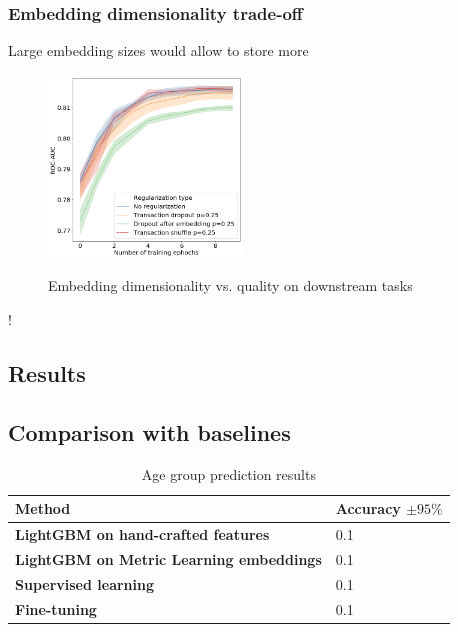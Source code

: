 \documentclass[sigconf]{acmart}
\begin{document}
\subsubsection{Embedding dimensionality trade-off}

Large embedding sizes would allow to store more

\begin{figure}[ht]
  \caption{Embedding dimensionality vs. quality on downstream tasks}
  \includegraphics[width=0.46\textwidth]{figures/tmp-pic.png}
  \label{fig-emb-dim}
\end{figure}


!

\subsection{Results} \label{sec-res}

\subsection{Comparison with baselines} \label{sec-res-baselines}


\begin{table}[ht]
\caption{Age group prediction results}
\begin{tabular}{ | m{18em} |  m{6em} | }
\hline
\textbf{Method} & \textbf{Accuracy $\pm 95\%$} \\
\hline
\textbf{LightGBM on hand-crafted features} & 0.1 \\
\textbf{LightGBM on Metric Learning embeddings} & 0.1 \\
\textbf{Supervised learning} & 0.1  \\
\textbf{Fine-tuning} & 0.1  \\
\hline
\end{tabular}
\label{tab-age-pred}
\end{table}
\end{document}
